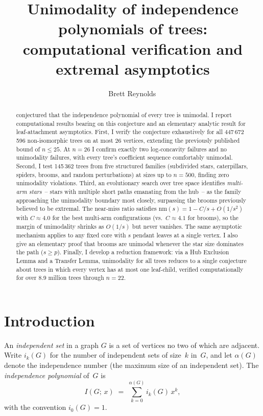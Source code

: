 \documentclass[12pt,oneside]{article}
\title{Unimodality of independence polynomials of trees:\\
  computational verification and extremal asymptotics}
\author{Brett Reynolds\,\orcidlink{0000-0003-0073-7195}}
\date{}
\theoremstyle{remark}
\newcommand{\nm}{\mathrm{nm}}             %
\begin{document}
\maketitle

\begin{abstract}
\citet{alavi1987} conjectured that the independence polynomial of every tree is unimodal.
I report computational results bearing on this conjecture and an elementary analytic result for leaf-attachment asymptotics.
First, I verify the conjecture exhaustively for all 447\,672\,596 non-isomorphic trees on at most 26 vertices, extending the previously published bound of $n \le 25$.
At $n = 26$ I confirm exactly two log-concavity failures and no unimodality failures, with every tree's coefficient sequence comfortably unimodal.
Second, I test 145\,362 trees from five structured families (subdivided stars, caterpillars, spiders, brooms, and random perturbations) at sizes up to $n = 500$, finding zero unimodality violations.
Third, an evolutionary search over tree space identifies \emph{multi-arm stars}~-- stars with multiple short paths emanating from the hub~-- as the family approaching the unimodality boundary most closely, surpassing the brooms previously believed to be extremal.
The near-miss ratio satisfies $\nm(s) = 1 - C/s + O(1/s^2)$ with $C \approx 4.0$ for the best multi-arm configurations (vs.\ $C \approx 4.1$ for brooms), so the margin of unimodality shrinks as $O(1/s)$ but never vanishes.
The same asymptotic mechanism applies to any fixed core with $s$ pendant leaves at a single vertex.
I also give an elementary proof that brooms are unimodal whenever the star size dominates the path ($s \ge p$).
Finally, I develop a reduction framework: via a Hub Exclusion Lemma and a Transfer Lemma, unimodality for all trees reduces to a single conjecture about trees in which every vertex has at most one leaf-child, verified computationally for over 8.9 million trees through $n = 22$.
\end{abstract}

\section{Introduction}\label{sec:intro}

An \emph{independent set} in a graph $G$ is a set of vertices no two of which are adjacent.
Write $i_k(G)$ for the number of independent sets of size~$k$ in~$G$, and let $\alpha(G)$ denote the independence number (the maximum size of an independent set).
The \emph{independence polynomial} of~$G$ is
\[
  I(G;\, x) \;=\; \sum_{k=0}^{\alpha(G)} i_k(G)\, x^k,
\]
with the convention $i_0(G) = 1$.
\end{document}
